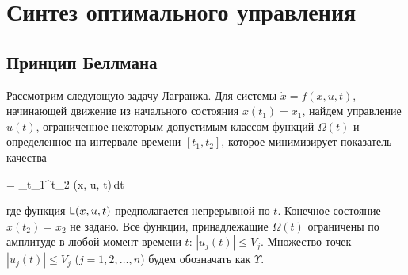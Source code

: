 


\chapter{Синтез оптимального управления}
\renewcommand{\funcF}{ \calf{F}           } %
\renewcommand{\optF}{  \optimum{\funcF}   } %
\newcommand{\optU}{    \optimum{u}        } %
\newcommand{\optX}{    \optimum{x}        } %
\newcommand{\funcL}{   \sff{L}            } %
\newcommand{\funcT}{   \optimum{\sff{F}}  } %
\newcommand{\funcV}{   \sff{V}            } %
\newcommand{\funcH}{   \optimum{H}        } %

\newcommand{\setS}{    \calf{S}           } %
\newcommand{\setV}{    \calf{V}           } %




\section{Принцип Беллмана}



Рассмотрим следующую задачу Лагранжа. Для системы $\dot{x} = f(x, u, t)$, начинающей движение из начального состояния $x(t_1) = x_1$, найдем управление $u(t)$, ограниченное некоторым допустимым классом функций $\Omega(t)$ и определенное на интервале времени $[t_1, t_2]$, которое минимизирует показатель качества

    \funcF = \int\limits_{t_1}^{t_2} \funcL(x, u, t)\,dt \text{,}
\eeq

где функция $\funcL(x, u, t)$ предполагается непрерывной по $t$. Конечное состояние $x(t_2) = x_2$ не задано. Все функции, принадлежащие $\Omega(t)$ ограничены по амплитуде в любой момент времени $t$: $|u_j(t)| \leqslant V_j$. Множество точек $|u_j(t)| \leqslant V_j$ ($j = 1, 2, \ldots, n$) будем обозначать как $\Upsilon$.

